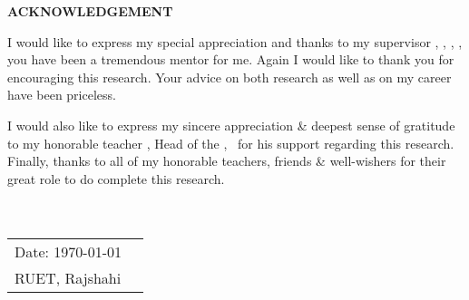 \documentclass[document.tex]{subfiles}
\begin{document}

\begin{center}
\textbf{{\fontsize{16pt}{0.5cm}\selectfont ACKNOWLEDGEMENT}}
\vspace{1cm}
\end{center}

\noindent I would like to express my special appreciation and thanks to my supervisor \textbf{\thesissupervisor}, \thesissupervisordesignation, \deptT, \ruet, you have been a tremendous mentor for me. Again I would like to thank you for encouraging this research. Your advice on both research as well as on my career have been priceless. 

\noindent I would also like to express my sincere appreciation \& deepest sense of gratitude to my honorable teacher \textbf{\depthead}, Head of the \deptT, \ruet \, for his support regarding this research.
\noindent Finally, thanks to all of my honorable teachers, friends \& well-wishers for their great role to do complete this research.
\\
\\\\
\noindent
\begin{tabularx}{\textwidth}{X X}
  {\fontsize{14pt}{0.5cm}\selectfont Date: \today} & \raggedleft { \fontsize{14pt}{0.5cm}\selectfont \authorname }\tabularnewline
{\fontsize{14pt}{0.5cm}\selectfont RUET, Rajshahi} & \tabularnewline
\end{tabularx}



\clearpage
\end{document}
